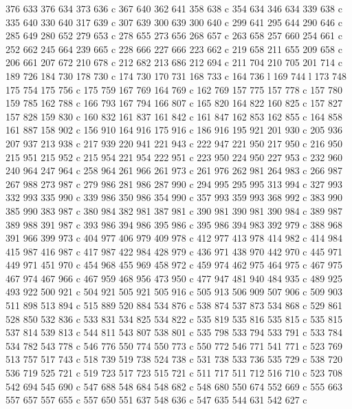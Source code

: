 {{   376 633 376 634 373 636 c
   367 640 362 641 358 638 c
   354 634 346 634 339 638 c
   335 640 330 640 317 639 c
   307 639 300 639 300 640 c
   299 641 295 644 290 646 c
   285 649 280 652 279 653 c
   278 655 273 656 268 657 c
   263 658 257 660 254 661 c
   252 662 245 664 239 665 c
   228 666 227 666 223 662 c
   219 658 211 655 209 658 c
   206 661 207 672 210 678 c
   212 682 213 686 212 694 c
   211 704 210 705 201 714 c
   189 726 184 730 178 730 c
   174 730 170 731 168 733 c
   164 736 l
   169 744 l
   173 748 175 754 175 756 c
   175 759 167 769 164 769 c
   162 769 157 775 157 778 c
   157 780 159 785 162 788 c
   166 793 167 794 166 807 c
   165 820 164 822 160 825 c
   157 827 157 828 159 830 c
   160 832 161 837 161 842 c
   161 847 162 853 162 855 c
   164 858 161 887 158 902 c
   156 910 164 916 175 916 c
   186 916 195 921 201 930 c
   205 936 207 937 213 938 c
   217 939 220 941 221 943 c
   222 947 221 950 217 950 c
   216 950 215 951 215 952 c
   215 954 221 954 222 951 c
   223 950 224 950 227 953 c
   232 960 240 964 247 964 c
   258 964 261 966 261 973 c
   261 976 262 981 264 983 c
   266 987 267 988 273 987 c
   279 986 281 986 287 990 c
   294 995 295 995 313 994 c
   327 993 332 993 335 990 c
   339 986 350 986 354 990 c
   357 993 359 993 368 992 c
   383 990 385 990 383 987 c
   380 984 382 981 387 981 c
   390 981 390 981 390 984 c
   389 987 389 988 391 987 c
   393 986 394 986 395 986 c
   395 986 394 983 392 979 c
   388 968 391 966 399 973 c
   404 977 406 979 409 978 c
   412 977 413 978 414 982 c
   414 984 415 987 416 987 c
   417 987 422 984 428 979 c
   436 971 438 970 442 970 c
   445 971 449 971 451 970 c
   454 968 455 969 458 972 c
   459 974 462 975 464 975 c
   467 975 467 974 467 966 c
   467 959 468 956 473 950 c
   477 947 481 940 484 935 c
   489 925 493 922 500 921 c
   504 921 505 921 505 916 c
   505 913 506 909 507 906 c
   509 903 511 898 513 894 c
   515 889 520 884 534 876 c
   538 874 537 873 534 868 c
   529 861 528 850 532 836 c
   533 831 534 825 534 822 c
   535 819 535 816 535 815 c
   535 815 537 814 539 813 c
   544 811 543 807 538 801 c
   535 798 533 794 533 791 c
   533 784 534 782 543 778 c
   546 776 550 774 550 773 c
   550 772 546 771 541 771 c
   523 769 513 757 517 743 c
   518 739 519 738 524 738 c
   531 738 533 736 535 729 c
   538 720 536 719 525 721 c
   519 723 517 723 515 721 c
   511 717 511 712 516 710 c
   523 708 542 694 545 690 c
   547 688 548 684 548 682 c
   548 680 550 674 552 669 c
   555 663 557 657 557 655 c
   557 650 551 637 548 636 c
   547 635 544 631 542 627 c
}}

